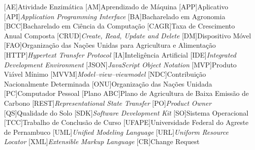 \begin{acronym}[ACRONYM] 
[AE]{Atividade Enzimática}
[AM]{Aprendizado de Máquina}
[APP]{Aplicativo}
[API]{\textit{Application Programming Interface}}
[BA]{Bacharelado em Agronomia}
[BCC]{Bacharelado em Ciência da Computação}
[CAGR]{Taxa de Crescimento Anual Composta}
[CRUD]{\textit{Create, Read, Update and Delete}}
[DM]{Dispositivo Móvel}
[FAO]{Organização das Nações Unidas para Agricultura e Alimentação}
[HTTP]{\textit{Hypertext Transfer Protocol}}
[IA]{Inteligência Artificial}
[IDE]{\textit{Integrated Development Environment}}
[JSON]{\textit{JavaScript Object Notation}}
[MVP]{Produto Viável Mínimo}
[MVVM]{\textit{Model–view–viewmodel}}
[NDC]{Contribuição Nacionalmente Determinada}
[ONU]{Organização das Nações Unidada}
[PC]{Computador Pessoal}
[Plano ABC]{Plano de Agricultura de Baixa Emissão de Carbono}
[REST]{\textit{Representational State Transfer}}
[PO]{\textit{Product Owner}}
[QS]{Qualidade do Solo}
[SDK]{\textit{Software Development Kit}}
[SO]{Sistema Operacional}
[TCC]{Trabalho de Conclusão de Curso}
[UFAPE]{Universidade Federal do Agreste de Pernambuco}
[UML]{\textit{Unified Modeling Language}}
[URL]{\textit{Uniform Resource Locator}}
[XML]{\textit{Extensible Markup Language}}
[CR]{Change Request}

\end{acronym}
